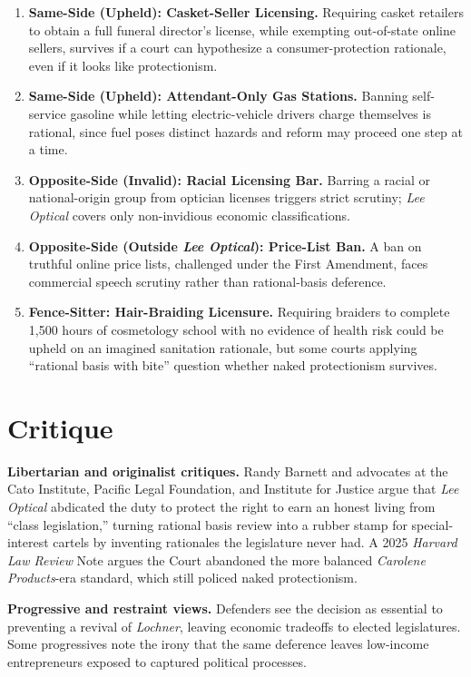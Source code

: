 \documentclass[12pt]{article}
\begin{document}
\begin{enumerate}
\item \textbf{Same-Side (Upheld): Casket-Seller Licensing.} Requiring casket retailers to obtain a full funeral director's license, while exempting out-of-state online sellers, survives if a court can hypothesize a consumer-protection rationale, even if it looks like protectionism.
\item \textbf{Same-Side (Upheld): Attendant-Only Gas Stations.} Banning self-service gasoline while letting electric-vehicle drivers charge themselves is rational, since fuel poses distinct hazards and reform may proceed one step at a time.
\item \textbf{Opposite-Side (Invalid): Racial Licensing Bar.} Barring a racial or national-origin group from optician licenses triggers strict scrutiny; \textit{Lee Optical} covers only non-invidious economic classifications.
\item \textbf{Opposite-Side (Outside \textit{Lee Optical}): Price-List Ban.} A ban on truthful online price lists, challenged under the First Amendment, faces commercial speech scrutiny rather than rational-basis deference.
\item \textbf{Fence-Sitter: Hair-Braiding Licensure.} Requiring braiders to complete 1,500 hours of cosmetology school with no evidence of health risk could be upheld on an imagined sanitation rationale, but some courts applying ``rational basis with bite'' question whether naked protectionism survives.
\end{enumerate}

\section{Critique}

\textbf{Libertarian and originalist critiques.} Randy Barnett and advocates at the Cato Institute, Pacific Legal Foundation, and Institute for Justice argue that \textit{Lee Optical} abdicated the duty to protect the right to earn an honest living from ``class legislation,'' turning rational basis review into a rubber stamp for special-interest cartels by inventing rationales the legislature never had. A 2025 \textit{Harvard Law Review} Note argues the Court abandoned the more balanced \textit{Carolene Products}-era standard, which still policed naked protectionism.

\textbf{Progressive and restraint views.} Defenders see the decision as essential to preventing a revival of \textit{Lochner}, leaving economic tradeoffs to elected legislatures. Some progressives note the irony that the same deference leaves low-income entrepreneurs exposed to captured political processes.
\end{document}
